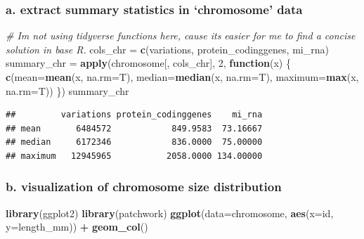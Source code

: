 \documentclass[
]{article}
\newenvironment{Shaded}{\begin{snugshade}}{\end{snugshade}}
\newcommand{\AttributeTok}[1]{\textcolor[rgb]{0.13,0.29,0.53}{#1}}
\newcommand{\CommentTok}[1]{\textcolor[rgb]{0.56,0.35,0.01}{\textit{#1}}}
\newcommand{\ControlFlowTok}[1]{\textcolor[rgb]{0.13,0.29,0.53}{\textbf{#1}}}
\newcommand{\DecValTok}[1]{\textcolor[rgb]{0.00,0.00,0.81}{#1}}
\newcommand{\FunctionTok}[1]{\textcolor[rgb]{0.13,0.29,0.53}{\textbf{#1}}}
\newcommand{\NormalTok}[1]{#1}
\newcommand{\OtherTok}[1]{\textcolor[rgb]{0.56,0.35,0.01}{#1}}
\newcommand{\SpecialCharTok}[1]{\textcolor[rgb]{0.81,0.36,0.00}{\textbf{#1}}}
\newcommand{\StringTok}[1]{\textcolor[rgb]{0.31,0.60,0.02}{#1}}
\begin{document}
\subsubsection{a. extract summary statistics in `chromosome'
data}\label{a.-extract-summary-statistics-in-chromosome-data}

\begin{Shaded}
\begin{Highlighting}[]
\CommentTok{\# I\textquotesingle{}m not using tidyverse functions here, cause it\textquotesingle{}s easier for me to find a concise solution in base R.}
\NormalTok{cols\_chr }\OtherTok{=} \FunctionTok{c}\NormalTok{(}\StringTok{\textquotesingle{}variations\textquotesingle{}}\NormalTok{, }\StringTok{\textquotesingle{}protein\_codinggenes\textquotesingle{}}\NormalTok{, }\StringTok{\textquotesingle{}mi\_rna\textquotesingle{}}\NormalTok{)}
\NormalTok{summary\_chr }\OtherTok{=} \FunctionTok{apply}\NormalTok{(chromosome[, cols\_chr], }\DecValTok{2}\NormalTok{, }\ControlFlowTok{function}\NormalTok{(x) \{}
  \FunctionTok{c}\NormalTok{(}\AttributeTok{mean=}\FunctionTok{mean}\NormalTok{(x, }\AttributeTok{na.rm=}\NormalTok{T),}
    \AttributeTok{median=}\FunctionTok{median}\NormalTok{(x, }\AttributeTok{na.rm=}\NormalTok{T),}
    \AttributeTok{maximum=}\FunctionTok{max}\NormalTok{(x, }\AttributeTok{na.rm=}\NormalTok{T))}
\NormalTok{\})}
\NormalTok{summary\_chr}
\end{Highlighting}
\end{Shaded}

\begin{verbatim}
##         variations protein_codinggenes    mi_rna
## mean       6484572            849.9583  73.16667
## median     6172346            836.0000  75.00000
## maximum   12945965           2058.0000 134.00000
\end{verbatim}

\subsubsection{b. visualization of chromosome size
distribution}\label{b.-visualization-of-chromosome-size-distribution}

\begin{Shaded}
\begin{Highlighting}[]
\FunctionTok{library}\NormalTok{(ggplot2)}
\FunctionTok{library}\NormalTok{(patchwork)}
\FunctionTok{ggplot}\NormalTok{(}\AttributeTok{data=}\NormalTok{chromosome, }\FunctionTok{aes}\NormalTok{(}\AttributeTok{x=}\NormalTok{id, }\AttributeTok{y=}\NormalTok{length\_mm)) }\SpecialCharTok{+} \FunctionTok{geom\_col}\NormalTok{()}
\end{Highlighting}
\end{Shaded}
\end{document}
